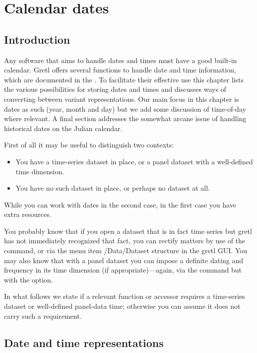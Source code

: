 \chapter{Calendar dates}
\label{chap:calendar}

\section{Introduction}
\label{sec:cal-intro}

Any software that aims to handle dates and times must have a good
built-in calendar. Gretl offers several functions to handle date and
time information, which are documented in the \GCR{}. To facilitate
their effective use this chapter lists the various possibilities for
storing dates and times and discusses ways of converting between
variant representations.  Our main focus in this chapter is dates as
such (year, month and day) but we add some discussion of time-of-day
where relevant. A final section addresses the somewhat arcane issue
of handling historical dates on the Julian calendar.

First of all it may be useful to distinguish two contexts:
\begin{itemize}
\item You have a time-series dataset in place, or a panel dataset with
  a well-defined time dimension.
\item You have no such dataset in place, or perhaps no dataset at all.
\end{itemize}

While you can work with dates in the second case, in the first case
you have extra resources.

You probably know that if you open a dataset that is in fact time
series but gretl has not immediately recognized that fact, you can
rectify matters by use of the  command, or via the menu
item \textsf{/Data/Dataset structure} in the gretl GUI. You may also
know that with a panel dataset you can impose a definite dating and
frequency in its time dimension (if appropriate)---again, via the
 command but with the  option.

In what follows we state if a relevant function or accessor requires a
time-series dataset or well-defined panel-data time; otherwise you can
assume it does not carry such a requirement.

\section{Date and time representations}
\label{sec:cal-representations}

